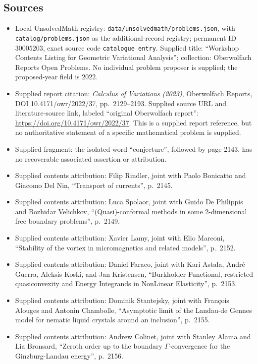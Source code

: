 \documentclass[11pt]{article}
\begin{document}
\subsection{Sources}
\begin{itemize}
\item Local UnsolvedMath registry: \texttt{data/unsolvedmath/problems.json}, with \texttt{catalog/problems.json} as the additional-record registry; permanent ID \(30005203\), exact source code \texttt{catalogue entry}. Supplied title: ``Workshop Contents Listing for Geometric Variational Analysis''; collection: Oberwolfach Reports Open Problems. No individual problem proposer is supplied; the proposed-year field is 2022.
\item Supplied report citation: \emph{Calculus of Variations (2023)}, Oberwolfach Reports, DOI 10.4171/owr/2022/37, pp.~2129--2193. Supplied source URL and literature-source link, labeled ``original Oberwolfach report'': \url{https://doi.org/10.4171/owr/2022/37}. This is a supplied report reference, but no authoritative statement of a specific mathematical problem is supplied.
\item Supplied fragment: the isolated word ``conjecture'', followed by page 2143, has no recoverable associated assertion or attribution.
\item Supplied contents attribution: Filip Rindler, joint with Paolo Bonicatto and Giacomo Del Nin, ``Transport of currents'', p.~2145.
\item Supplied contents attribution: Luca Spolaor, joint with Guido De Philippis and Bozhidar Velichkov, ``(Quasi)-conformal methods in some 2-dimensional free boundary problems'', p.~2149.
\item Supplied contents attribution: Xavier Lamy, joint with Elio Marconi, ``Stability of the vortex in micromagnetics and related models'', p.~2152.
\item Supplied contents attribution: Daniel Faraco, joint with Kari Astala, André Guerra, Aleksis Koski, and Jan Kristensen, ``Burkholder Functional, restricted quasiconvexity and Energy Integrands in NonLinear Elasticity'', p.~2153.
\item Supplied contents attribution: Dominik Stantejsky, joint with François Alouges and Antonin Chambolle, ``Asymptotic limit of the Landau-de Gennes model for nematic liquid crystals around an inclusion'', p.~2155.
\item Supplied contents attribution: Andrew Colinet, joint with Stanley Alama and Lia Bronsard, ``Zeroth order up to the boundary \(\Gamma\)-convergence for the Ginzburg-Landau energy'', p.~2156.

\end{itemize}
\end{document}

